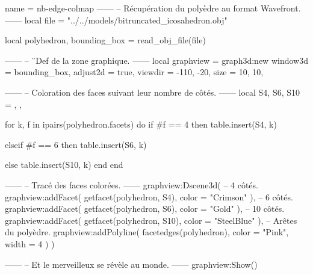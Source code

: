 \documentclass{standalone}
\begin{document}
\begin{luadraw}{name = nb-edge-colmap}
------
-- Récupération du polyèdre au format Wavefront.
------
local file = "../../models/bitruncated_icosahedron.obj"

local polyhedron, bounding_box = read_obj_file(file)

------
-- ¨Def de la zone graphique.
------
local graphview = graph3d:new{
  window3d = bounding_box,
  adjust2d = true,
  viewdir  = {-110, -20},
  size     = {10, 10},
}

------
-- Coloration des faces suivant leur nombre de côtés.
------
local S4, S6, S10 = {}, {}, {}

for k, f in ipairs(polyhedron.facets) do
  if #f == 4 then
    table.insert(S4, k)

  elseif #f == 6 then
    table.insert(S6, k)

  else
    table.insert(S10, k)
  end
end

------
-- Tracé des faces colorées.
------
graphview:Dscene3d(
-- 4 côtés.
  graphview:addFacet(
    getfacet(polyhedron, S4),
    {color = "Crimson"}
  ),
-- 6 côtés.
  graphview:addFacet(
    getfacet(polyhedron, S6),
    {color = "Gold"}
  ),
-- 10 côtés.
  graphview:addFacet(
    getfacet(polyhedron, S10),
    {color = "SteelBlue"}
  ),
-- Arêtes du polyèdre.
  graphview:addPolyline(
    facetedges(polyhedron),
    {
      color = "Pink",
      width = 4
    }
  )
)

------
-- Et le merveilleux se révèle au monde.
------
graphview:Show()
\end{luadraw}
\end{document}
